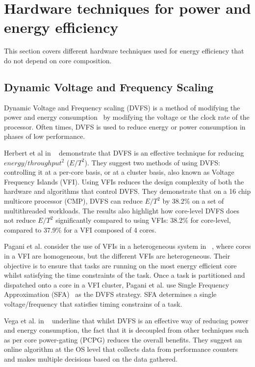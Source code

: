 \section{Hardware techniques for power and energy efficiency}

This section covers different hardware techniques used for energy efficiency that do not depend on core composition.

\subsection{Dynamic Voltage and Frequency Scaling}
Dynamic Voltage and Frequency scaling (DVFS) is a method of modifying the power and energy consumption~\cite{paganiEECHM2017} by modifying the voltage or the clock rate of the processor.
Often times, DVFS is used to reduce energy or power consumption in phases of low performance.

Herbert et al in ~\cite{herbertDVFS07} demonstrate that DVFS is an effective technique for reducing $energy/throughput^2$ ($E/T^2$).
They suggest two methods of using DVFS: controlling it at a per-core basis, or at a cluster basis, also known as Voltage Frequency Islands (VFI).
Using VFIs reduces the design complexity of both the hardware and algorithms that control DVFS.
They demonstrate that on a 16 chip multicore processor (CMP), DVFS can reduce $E/T^2$ by 38.2\% on a set of multithreaded workloads.
The results also highlight how core-level DVFS does not reduce $E/T^2$ significantly compared to using VFIs: 38.2\% for core-level, compared to 37.9\% for a VFI composed of 4 cores.

Pagani et al. consider the use of VFIs in a heterogeneous system in ~\cite{paganiEECHM2017}, where cores in a VFI are homogeneous, but the different VFIs are heterogeneous.
Their objective is to ensure that tasks are running on the most energy efficient core whilst satisfying the time constraints of the task.
Once a task is partitioned and dispatched onto a core in a VFI cluster, Pagani et al. use Single Frequency Approximation (SFA)~\cite{sfaScheme} as the DVFS strategy.
SFA determines a single voltage/frequency that satisfies timing constrains of a task.


Vega et al. in ~\cite{vega2013crank} underline that whilst DVFS is an effective way of reducing power and energy consumption, the fact that it is decoupled from other techniques such as per core power-gating (PCPG) reduces the overall benefits.
They suggest an online algorithm at the OS level that collects data from performance counters and makes multiple decisions based on the data gathered.

